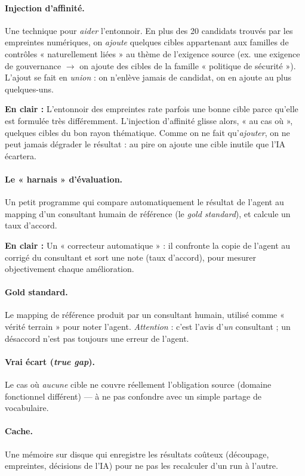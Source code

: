 \documentclass[11pt,a4paper]{report}
\newcommand{\enclair}[1]{\begin{plain}\textbf{En clair :} #1\end{plain}}
\begin{document}
\paragraph{Injection d'affinité.} Une technique pour \emph{aider} l'entonnoir. En plus des 20 candidats trouvés par les empreintes numériques, on \emph{ajoute} quelques cibles appartenant aux familles de contrôles « naturellement liées » au thème de l'exigence source (ex. une exigence de gouvernance $\rightarrow$ on ajoute des cibles de la famille « politique de sécurité »). L'ajout se fait en \emph{union} : on n'enlève jamais de candidat, on en ajoute au plus quelques-uns.
\enclair{L'entonnoir des empreintes rate parfois une bonne cible parce qu'elle est formulée très différemment. L'injection d'affinité glisse alors, « au cas où », quelques cibles du bon rayon thématique. Comme on ne fait qu'\emph{ajouter}, on ne peut jamais dégrader le résultat : au pire on ajoute une cible inutile que l'IA écartera.}

\paragraph{Le « harnais » d'évaluation.} Un petit programme qui compare automatiquement le résultat de l'agent au mapping d'un consultant humain de référence (le \emph{gold standard}), et calcule un taux d'accord.
\enclair{Un « correcteur automatique » : il confronte la copie de l'agent au corrigé du consultant et sort une note (taux d'accord), pour mesurer objectivement chaque amélioration.}

\paragraph{Gold standard.} Le mapping de référence produit par un consultant humain, utilisé comme « vérité terrain » pour noter l'agent. \emph{Attention} : c'est l'avis d'\emph{un} consultant ; un désaccord n'est pas toujours une erreur de l'agent.

\paragraph{Vrai écart (\emph{true gap}).} Le cas où \emph{aucune} cible ne couvre réellement l'obligation source (domaine fonctionnel différent) — à ne pas confondre avec un simple partage de vocabulaire.

\paragraph{Cache.} Une mémoire sur disque qui enregistre les résultats coûteux (découpage, empreintes, décisions de l'IA) pour ne pas les recalculer d'un run à l'autre.
\end{document}
